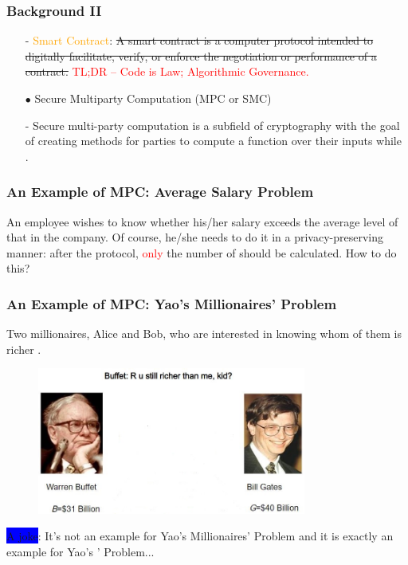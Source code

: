 \documentclass{beamer}
\begin{document}
\begin{frame}\frametitle{Background II} 
\begin{enumerate}
	\item[] - \textcolor{orange}{Smart Contract}: \sout{A smart contract is a computer protocol intended to digitally facilitate, verify, or enforce the negotiation or performance of a contract.} \textcolor{red}{TL;DR -- Code is Law; Algorithmic Governance.}
	\item[$\bullet$] Secure Multiparty Computation (MPC or SMC)
	\item[] - Secure multi-party computation is a subfield of cryptography with the goal of creating methods for parties to \uwave{\textcolor{orange}{jointly}} compute a function over their inputs while . 
\end{enumerate}
\end{frame}


\begin{frame}\frametitle{An Example of MPC: Average Salary Problem} 
An employee wishes to know whether his/her salary exceeds the average level of that in the company. Of course, he/she needs to do it in a privacy-preserving manner: after the protocol, \textcolor{red}{only} the number of  should be calculated. How to do this?

\end{frame}

\begin{frame}\frametitle{An Example of MPC: Yao's Millionaires' Problem} 
Two millionaires, Alice and Bob, who are interested in knowing whom of them is richer .
\begin{figure}
	\includegraphics[width=3.1 in, height=1.9in]{myfigs/SMC.jpg}
\end{figure}
\pause
\colorbox{blue}{A joke}: It's not an example for Yao's Millionaires' Problem and it is exactly an example for Yao's ' Problem...

\end{frame}
\end{document}
